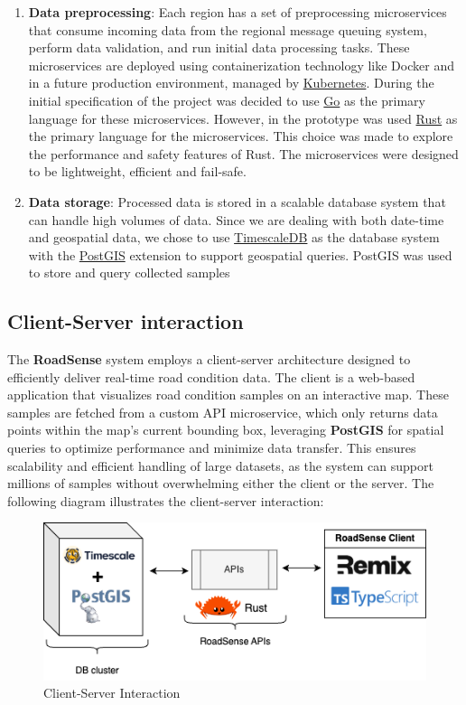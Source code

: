 \begin{enumerate}
	\item \textbf{Data preprocessing}: Each region has a set of preprocessing microservices that consume incoming data from the regional message queuing system, perform data validation, and run initial data processing tasks. These microservices are deployed using containerization technology like Docker and in a future production environment, managed by \href{https://kubernetes.io/}{Kubernetes}.
	      During the initial specification of the project was decided to use \href{https://golang.org/}{Go} as the primary language for these microservices. However, in the prototype was used \href{https://rust-lang.org/}{Rust} as the primary language for the microservices. This choice was made to explore the performance and safety features of Rust. The microservices were designed to be lightweight, efficient and fail-safe.

	\item \textbf{Data storage}: Processed data is stored in a scalable database system that can handle high volumes of data. Since we are dealing with both date-time and geospatial data, we chose to use \href{https://www.timescale.com/}{TimescaleDB} as the database system with the \href{https://postgis.net/}{PostGIS} extension to support geospatial queries.
	      PostGIS was used to store and query collected samples
\end{enumerate}

\subsection{Client-Server interaction}

The \textbf{RoadSense} system employs a client-server architecture designed to efficiently deliver real-time road condition data. The client is a web-based application that visualizes road condition samples on an interactive map. These samples are fetched from a custom API microservice, which only returns data points within the map's current bounding box, leveraging \textbf{PostGIS} for spatial queries to optimize performance and minimize data transfer. This ensures scalability and efficient handling of large datasets, as the system can support millions of samples without overwhelming either the client or the server. The following diagram illustrates the client-server interaction:

\begin{figure}[H]
  \centering
  \includegraphics[width=\textwidth]{../../assets/diagrams/client_server_architecture/client_server_arch.png}
  \caption{Client-Server Interaction}
\end{figure}

